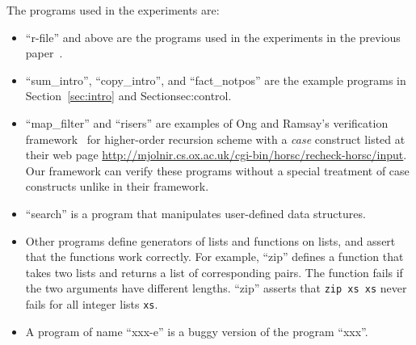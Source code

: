 The programs used in the experiments are:
\vspace{-5pt}
\begin{itemize}
\item ``r-file'' and above are the programs used in the experiments in
      the previous paper~\cite{KobayashiPLDI2011}.
\item ``sum\_intro'', ``copy\_intro'', and ``fact\_notpos'' are the example programs in
      Section~\ref{sec:intro} and Section{sec:control}.
\item ``map\_filter'' and ``risers'' are examples of Ong and
      Ramsay's verification framework~\cite{Ong2011} for higher-order
      recursion scheme with a \textit{case} construct listed at their
      web page
      \url{http://mjolnir.cs.ox.ac.uk/cgi-bin/horsc/recheck-horsc/input}.
      Our framework can verify these programs without a special
      treatment of case constructs unlike in their framework.
\item ``search'' is a program that manipulates user-defined data structures.
\item Other programs define generators of lists and functions on lists,
      and assert that the functions work correctly.  For example,
      ``zip'' defines a function that takes two lists and returns a list of corresponding pairs.
      The function fails if the two arguments have different lengths.
      ``zip'' asserts that \texttt{zip xs xs} never fails for all integer lists \texttt{xs}.
\item A program of name ``xxx-e'' is a buggy version of the program ``xxx''.
\end{itemize}
\vspace{-5pt}

